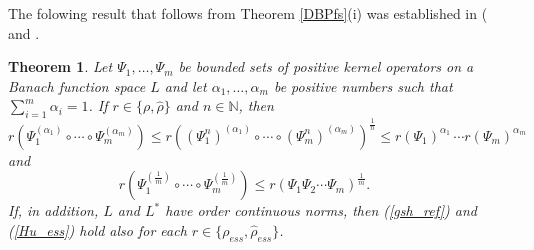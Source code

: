 \documentclass[12pt, reqno]{amsart}
\newtheorem{theorem}{Theorem}[section]
\theoremstyle{definition}
\theoremstyle{remark}
\numberwithin{equation}{section}
\newcommand{\be}{\begin{equation}}
\newcommand{\ee}{\end{equation}}
\newcommand{\NN}{\mathbb{N}}
\begin{document}
The folowing result that follows from Theorem \ref{DBPfs}(i) was established in (\cite[Theorem 3.3]{P17} and \cite[Theorems 3.1 and 3.8]{P19}.  %


\begin{theorem} Let $\Psi _1, \ldots , \Psi _m$ be bounded sets of positive kernel operators on a Banach function space $L$ and let
 $\alpha _1, \ldots , \alpha _m$ be positive numbers such that \\
$\sum _{i=1} ^m \alpha _i = 1$.  If  $r \in \{\rho, \hat{\rho}\}$ and $n \in \NN$, then
\be
r (\Psi _1 ^{( \alpha _1)} \circ \cdots \circ \Psi _m ^{(\alpha _m)} ) \le  r ((\Psi _1 ^n ) ^{( \alpha _1)} \circ \cdots \circ (\Psi _m ^n) ^{(\alpha _m)} ) ^{ \frac{1}{n}} \le
r(\Psi _1)^{ \alpha _1} \, \cdots r(\Psi _m)^{\alpha _m}
\label{gsh_ref}
\ee
and
\be
r \left(\Psi _1 ^{\left( \frac{1}{m} \right)} \circ \cdots \circ \Psi _m  ^{\left( \frac{1}{m} \right)} \right) \le r(\Psi _1 \Psi _2 \cdots \Psi _m) ^{\frac{1}{m}}.\;\;\;\;\;\;\;\;
\label{Hu_ess}
\ee
If, in addition, $L$ and $L^*$ have order continuous norms, then (\ref{gsh_ref}) and (\ref{Hu_ess}) hold also  for each $r\in \{ \rho _{ess}, \hat{\rho} _{ess}\}$.
\label{powers}
\end{theorem}
\end{document}
